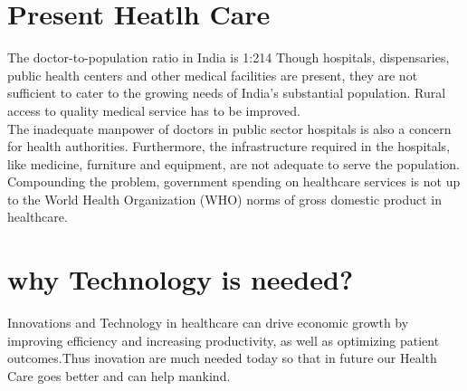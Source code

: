 \documentclass[12pt]{report}
\begin{document}
\section{Present Heatlh Care}
The doctor-to-population ratio in India is 1:214 Though hospitals, dispensaries, public health centers and other medical facilities are present, they are not sufficient to cater to the growing needs of India's substantial population. Rural access to quality medical service has to be improved.\\
The inadequate manpower of doctors in public sector hospitals is also a concern for health authorities. Furthermore, the infrastructure required in the hospitals, like medicine, furniture and equipment, are not adequate to serve the population. Compounding the problem, government spending on healthcare services is not up to the World Health Organization (WHO) norms of gross domestic product in healthcare.\\

\section{why Technology is needed?}

Innovations and Technology in healthcare can drive economic growth by improving efficiency and increasing productivity, as well as optimizing patient outcomes.Thus inovation are much needed today so that in future our Health Care goes better and can help mankind.

\clearpage
\end{document}
